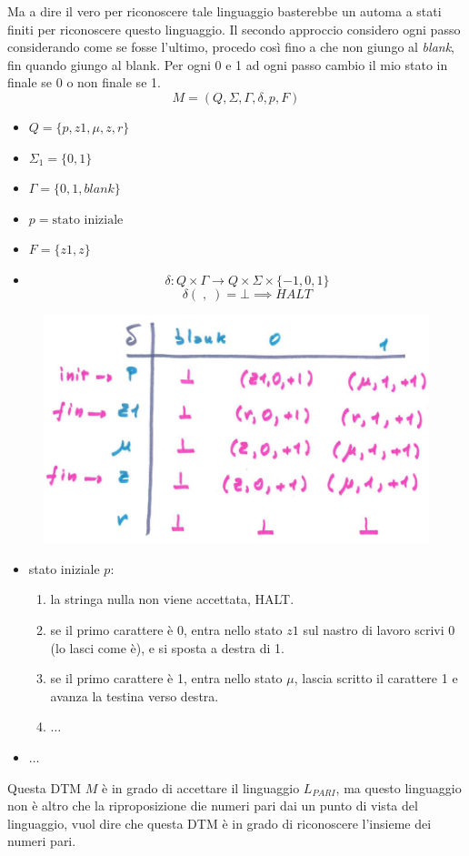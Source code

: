 \documentclass{article}
\begin{document}
Ma a dire il vero per riconoscere tale linguaggio basterebbe un automa a stati
finiti per riconoscere questo linguaggio. Il secondo approccio considero
ogni passo considerando come se fosse l'ultimo, procedo così fino a che non
giungo al \textit{blank}, fin quando giungo al blank. Per ogni 0 e 1 ad ogni
passo cambio il mio stato in finale se 0 o non finale se 1.
$$M=(Q,\Sigma,\Gamma,\delta,p,F)$$
\begin{itemize}
    \item $Q=\{p,z1,\mu,z,r\}$
    \item $\Sigma_1=\{0,1\}$
    \item $\Gamma=\{0,1,blank\}$
    \item $p=\text{stato iniziale}$
    \item $F=\{z1,z\}$
    \item $$\delta:Q\times\Gamma\rightarrow Q\times\Sigma\times\{-1,0,1\}$$
    $$\delta(\;,\;)=\bot\implies HALT$$
\end{itemize}

\begin{figure}[H]
    \centering
    \includegraphics[scale=0.6]{images/dtm_lpari.png}
\end{figure}

\begin{itemize}
    \item stato iniziale $p$:
    \begin{enumerate}
        \item la stringa nulla non viene accettata, HALT.
        \item se il primo carattere è 0, entra nello stato $z1$ sul
        nastro di lavoro scrivi 0 (lo lasci come è), e si sposta a destra di 1.
        \item se il primo carattere è 1, entra nello stato $\mu$, lascia scritto
        il carattere 1 e avanza la testina verso destra.
        \item $\dots$
    \end{enumerate}
    \item $\dots$
\end{itemize}
Questa DTM $M$ è in grado di accettare il linguaggio $L_{PARI}$, ma questo linguaggio
non è altro che la riproposizione die numeri pari dai un punto di
vista del linguaggio, vuol dire che questa DTM è in grado di riconoscere l'insieme
dei numeri pari.
\end{document}
